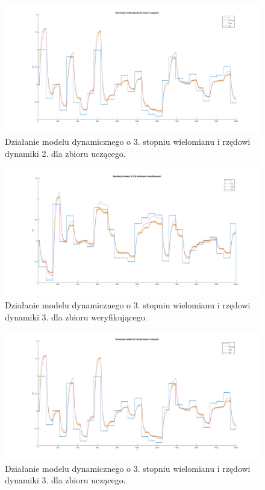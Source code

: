 \begin{figure}[H]
\centering
\includegraphics[width=16cm,trim={5cm 1cm 5cm 1cm},clip]{images/d16.png}
\caption{Działanie modelu dynamicznego o 3. stopniu wielomianu i rzędowi dynamiki 2. dla zbioru uczącego.}
\label{fig:d16}
\end{figure}
\begin{figure}[H]
\centering
\includegraphics[width=16cm,trim={5cm 1cm 5cm 1cm},clip]{images/d17.png}
\caption{Działanie modelu dynamicznego o 3. stopniu wielomianu i rzędowi dynamiki 3. dla zbioru weryfikującego.}
\label{fig:d17}
\end{figure}
\begin{figure}[H]
\centering
\includegraphics[width=16cm,trim={5cm 1cm 5cm 1cm},clip]{images/d18.png}
\caption{Działanie modelu dynamicznego o 3. stopniu wielomianu i rzędowi dynamiki 3. dla zbioru uczącego.}
\label{fig:d18}
\end{figure}
